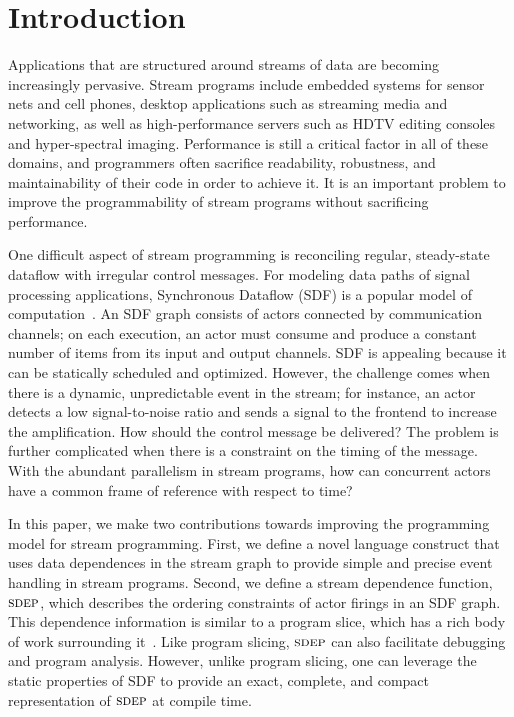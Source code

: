 \section{Introduction}

Applications that are structured around streams of data are becoming
increasingly pervasive.  Stream programs include embedded systems for
sensor nets and cell phones, desktop applications such as streaming
media and networking, as well as high-performance servers such as HDTV
editing consoles and hyper-spectral imaging.  Performance is still a
critical factor in all of these domains, and programmers often
sacrifice readability, robustness, and maintainability of their code
in order to achieve it.  It is an important problem to improve the
programmability of stream programs without sacrificing performance.

One difficult aspect of stream programming is reconciling regular,
steady-state dataflow with irregular control messages.  For modeling
data paths of signal processing applications, Synchronous Dataflow
(SDF) is a popular model of computation~\cite{LM87-i}.  An SDF graph
consists of actors connected by communication channels; on each
execution, an actor must consume and produce a constant number of
items from its input and output channels.  SDF is appealing because it
can be statically scheduled and optimized.  However, the challenge
comes when there is a dynamic, unpredictable event in the stream; for
instance, an actor detects a low signal-to-noise ratio and sends a
signal to the frontend to increase the amplification.  How should the
control message be delivered?  The problem is further complicated when
there is a constraint on the timing of the message.  With the abundant
parallelism in stream programs, how can concurrent actors have a
common frame of reference with respect to time?

In this paper, we make two contributions towards improving the
programming model for stream programming.  First, we define a novel
language construct that uses data dependences in the stream graph to
provide simple and precise event handling in stream programs.  Second,
we define a stream dependence function, $\textsc{sdep}$, which describes the
ordering constraints of actor firings in an SDF graph.  This
dependence information is similar to a program slice, which has a rich
body of work surrounding it~\cite{tip95slice,hrb88pdg,pugh97slice}.
Like program slicing, $\textsc{sdep}$ can also facilitate debugging and
program analysis.  However, unlike program slicing, one can leverage
the static properties of SDF to provide an exact, complete, and
compact representation of $\textsc{sdep}$ at compile time.  

